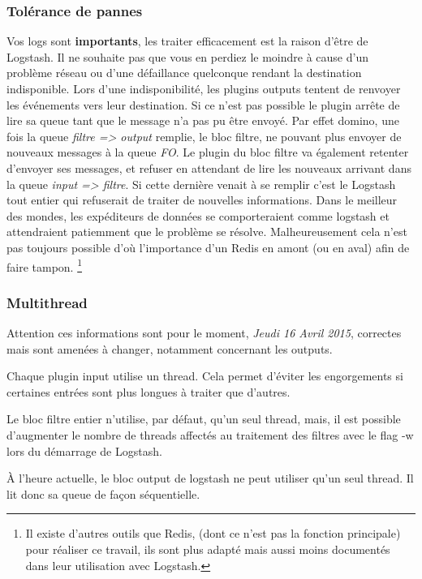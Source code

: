 \subsubsection{Tolérance de pannes}
Vos logs sont \textbf{importants}, les traiter efficacement est la raison d'être 
de Logstash. Il ne souhaite pas que vous en perdiez le moindre à cause d'un problème 
réseau ou d'une défaillance quelconque rendant la destination indisponible.
Lors d'une indisponibilité, les plugins outputs tentent de renvoyer les événements 
vers leur destination. Si ce n'est pas possible le plugin arrête de lire sa queue 
tant que le message n'a pas pu être envoyé. Par effet domino, une fois la queue 
\textit{filtre => output} remplie, le bloc filtre, ne pouvant plus envoyer de nouveaux 
messages à la queue \textit{FO}. Le plugin du bloc filtre va également retenter 
d'envoyer ses messages, et refuser en attendant de lire les nouveaux arrivant dans 
la queue \textit{input => filtre}.
Si cette dernière venait à se remplir c'est le Logstash tout entier qui refuserait de 
traiter de nouvelles informations. Dans le meilleur des mondes, les expéditeurs de
données se comporteraient comme logstash et attendraient patiemment que le problème
se résolve. Malheureusement cela n'est pas toujours possible d'où l'importance d'un 
Redis en amont (ou en aval) afin de faire tampon.
\footnote{Il existe d'autres outils que Redis, (dont ce n'est pas la fonction
principale) pour réaliser ce travail, ils sont plus adapté mais aussi moins documentés
dans leur utilisation avec Logstash.}

\subsubsection{Multithread}
Attention ces informations sont pour le moment, \textit{Jeudi 16 Avril 2015}, correctes 
mais sont amenées à changer, notamment concernant les outputs.

Chaque plugin input utilise un \gls{thread}. Cela permet d'éviter les engorgements si  
certaines entrées sont plus longues à traiter que d'autres.

Le bloc filtre entier n'utilise, par défaut, qu'un seul thread, mais, il est possible 
d'augmenter le nombre de threads affectés au traitement des filtres avec le \gls{flag}
-w lors du démarrage de Logstash.

À l'heure actuelle, le bloc output de logstash ne peut utiliser qu'un seul thread.
Il lit donc sa queue de façon séquentielle.


